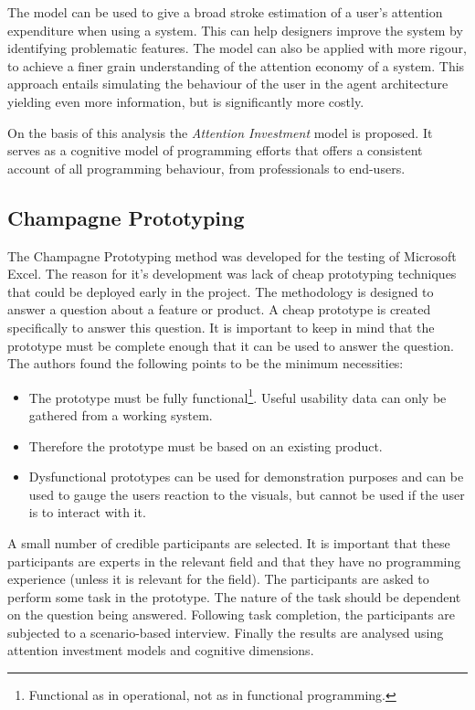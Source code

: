 The model can be used to give a broad stroke estimation of a user's attention expenditure when using a system. This can help designers improve the system by identifying problematic features. The model can also be applied with more rigour, to achieve a finer grain understanding of the attention economy of a system. This approach entails simulating the behaviour of the user in the agent architecture yielding even more information, but is significantly more costly.

On the basis of this analysis the \textit{Attention Investment} model is proposed. It serves as a cognitive model of programming efforts that offers a consistent account of all programming behaviour, from professionals to end-users.

\subsection{Champagne Prototyping} \label{sec:champagne}
The Champagne Prototyping method was developed for the testing of Microsoft Excel\cite{blackwell2004champagne}. The reason for it's development was lack of cheap prototyping techniques that could be deployed early in the project. The methodology is designed to answer a question about a feature or product. A cheap prototype is created specifically to answer this question. It is important to keep in mind that the prototype must be complete enough that it can be used to answer the question. The authors found the following points to be the minimum necessities:
\begin{itemize}
    \item The prototype must be fully functional\footnote{Functional as in operational, not as in functional programming.}. Useful usability data can only be gathered from a working system.
    \item Therefore the prototype must be based on an existing product.
    \item Dysfunctional prototypes can be used for demonstration purposes and can be used to gauge the users reaction to the visuals, but cannot be used if the user is to interact with it.
\end{itemize}
A small number of credible participants are selected. It is important that these participants are experts in the relevant field and that they have no programming experience (unless it is relevant for the field). The participants are asked to perform some task in the prototype. The nature of the task should be dependent on the question being answered. Following task completion, the participants are subjected to a scenario-based interview. Finally the results are analysed using attention investment models and cognitive dimensions.

